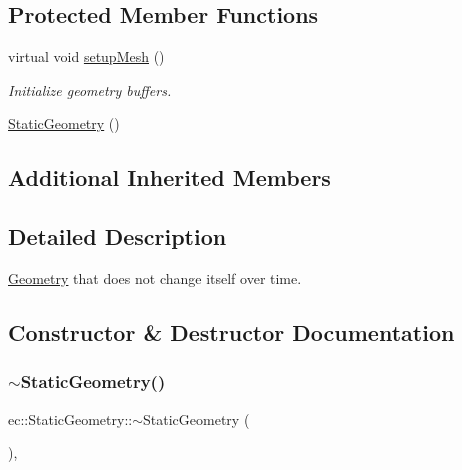 \subsection*{Protected Member Functions}
\begin{DoxyCompactItemize}
\item 
virtual void \mbox{\hyperlink{classec_1_1_static_geometry_a971d3c59c50d0ae540b95ecb77d5a05a}{setup\+Mesh}} ()
\begin{DoxyCompactList}\small\item\em Initialize geometry buffers. \end{DoxyCompactList}\item 
\mbox{\hyperlink{classec_1_1_static_geometry_ad707c706ce148f5c9d6d8ddb2321807b}{Static\+Geometry}} ()
\end{DoxyCompactItemize}
\subsection*{Additional Inherited Members}


\subsection{Detailed Description}
\mbox{\hyperlink{classec_1_1_geometry}{Geometry}} that does not change itself over time. 

\subsection{Constructor \& Destructor Documentation}
\mbox{\label{classec_1_1_static_geometry_a47d1f09c1042762be9a9d4a492db2366}} 
\subsubsection{\texorpdfstring{$\sim$\+Static\+Geometry()}{~StaticGeometry()}}
{\footnotesize\ttfamily ec\+::\+Static\+Geometry\+::$\sim$\+Static\+Geometry (\begin{DoxyParamCaption}{ }\end{DoxyParamCaption})\hspace{0.3cm}{\ttfamily [virtual]}, {\ttfamily [default]}}

\mbox{\label{classec_1_1_static_geometry_ad707c706ce148f5c9d6d8ddb2321807b}} 
